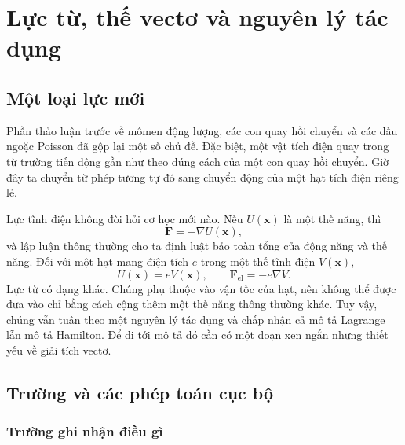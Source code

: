 \chapter{Lực từ, thế vectơ và nguyên lý tác dụng}


\section{Một loại lực mới}

Phần thảo luận trước về mômen động lượng, các con quay hồi chuyển và các dấu ngoặc Poisson đã gộp lại một số chủ đề. Đặc biệt, một vật tích điện quay trong từ trường tiến động gần như theo đúng cách của một con quay hồi chuyển. Giờ đây ta chuyển từ phép tương tự đó sang chuyển động của một hạt tích điện riêng lẻ.

Lực tĩnh điện không đòi hỏi cơ học mới nào. Nếu \(U(\mathbf x)\) là một thế năng, thì
\begin{equation}
  \mathbf F=-\nabla U(\mathbf x),
\end{equation}
và lập luận thông thường cho ta định luật bảo toàn tổng của động năng và thế năng. Đối với một hạt mang điện tích \(e\) trong một thế tĩnh điện \(V(\mathbf x)\),
\begin{equation}
  U(\mathbf x)=eV(\mathbf x),
  \qquad
  \mathbf F_{\mathrm{el}}=-e\nabla V.
\end{equation}
Lực từ có dạng khác. Chúng phụ thuộc vào vận tốc của hạt, nên không thể được đưa vào chỉ bằng cách cộng thêm một thế năng thông thường khác. Tuy vậy, chúng vẫn tuân theo một nguyên lý tác dụng và chấp nhận cả mô tả Lagrange lẫn mô tả Hamilton. Để đi tới mô tả đó cần có một đoạn xen ngắn nhưng thiết yếu về giải tích vectơ.

\section{Trường và các phép toán cục bộ}

\subsection{Trường ghi nhận điều gì}

